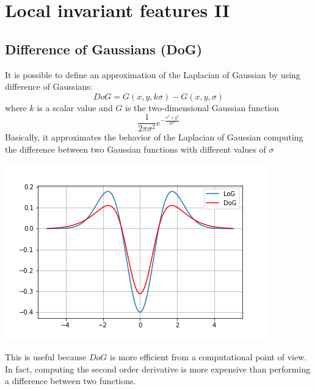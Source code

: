 \chapter{Local invariant features II}
\section{Difference of Gaussians (DoG)}
It is possible to define an approximation of the Laplacian of Gaussian by using difference of Gaussians:
\[DoG = G(x,y,k\sigma) - G(x,y,\sigma)\]
where $k$ is a scalar value and $G$ is the two-dimensional Gaussian function
\[\frac{1}{2\pi \sigma^{2}}e^{-\frac{x^{2} + y^{2}}{2\sigma^{2}}}\]
Basically, it approximates the behavior of the Laplacian of Gaussian computing the difference between two Gaussian functions with different values of $\sigma$
\begin{center}
    \includegraphics[scale = 0.7]{images/DoG Approx.png}
\end{center}
This is useful because $DoG$ is more efficient from a computational point of view. In fact, computing the second order derivative is more expensive than performing a difference between two functions.
